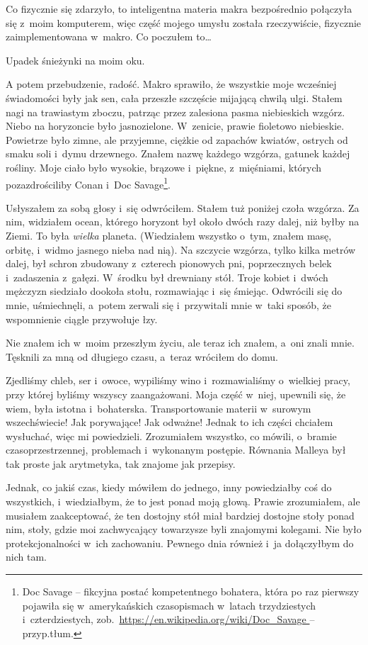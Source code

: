 \documentclass[oneside,polish,11pt,sfheadings]{mwbk}
\begin{document}
Co fizycznie się zdarzyło, to inteligentna materia makra bezpośrednio
połączyła się z~moim komputerem, więc część mojego umysłu została
rzeczywiście, fizycznie zaimplementowana w~makro. Co poczułem to\ldots

Upadek śnieżynki na moim oku.

A potem przebudzenie, radość. Makro sprawiło, że wszystkie moje
wcześniej świadomości były jak sen, cała przeszłe szczęście mijającą
chwilą ulgi. Stałem nagi na trawiastym zboczu, patrząc przez zalesiona
pasma niebieskich wzgórz. Niebo na horyzoncie było jasnozielone. W~zenicie, prawie fioletowo niebieskie. Powietrze było zimne, ale
przyjemne, ciężkie od zapachów kwiatów, ostrych od smaku soli i~dymu
drzewnego. Znałem nazwę każdego wzgórza, gatunek każdej rośliny. Moje
ciało było wysokie, brązowe i~piękne, z~mięśniami, których
pozazdrościliby Conan i~Doc Savage\footnote{ Doc Savage -- fikcyjna postać
kompetentnego bohatera, która po raz pierwszy pojawiła się w~amerykańskich czasopismach w~latach trzydziestych i~czterdziestych,
zob.~\url{https://en.wikipedia.org/wiki/Doc_Savage } -- przyp.tłum.}. 

Usłyszałem za sobą głosy i~się odwróciłem. Stałem tuż poniżej czoła
wzgórza. Za nim, widziałem ocean, którego horyzont był około dwóch razy
dalej, niż byłby na Ziemi. To była \emph{wielka} planeta. (Wiedziałem
wszystko o~tym, znałem masę, orbitę, i~widmo jasnego nieba nad nią). Na
szczycie wzgórza, tylko kilka metrów dalej, był schron zbudowany z~czterech pionowych pni, poprzecznych belek i~zadaszenia z~gałęzi. W~środku był drewniany stół. Troje kobiet i~dwóch mężczyzn siedziało
dookoła stołu, rozmawiając i~się śmiejąc. Odwrócili się do mnie,
uśmiechnęli, a~potem zerwali się i~przywitali mnie w~taki sposób, że
wspomnienie ciągle przywołuje łzy.

Nie znałem ich w~moim przeszłym życiu, ale teraz ich znałem, a~oni znali
mnie. Tęsknili za mną od długiego czasu, a~teraz wróciłem do domu.

Zjedliśmy chleb, ser i~owoce, wypiliśmy wino i~rozmawialiśmy o~wielkiej
pracy, przy której byliśmy wszyscy zaangażowani. Moja część w~niej,
upewnili się, że wiem, była istotna i~bohaterska. Transportowanie
materii w~surowym wszechświecie! Jak porywające! Jak odważne! Jednak to
ich części chciałem wysłuchać, więc mi powiedzieli. Zrozumiałem
wszystko, co mówili, o~bramie czasoprzestrzennej, problemach i~wykonanym
postępie. Równania Malleya był tak proste jak arytmetyka, tak znajome
jak przepisy.

Jednak, co jakiś czas, kiedy mówiłem do jednego, inny powiedziałby coś
do wszystkich, i~wiedziałbym, że to jest ponad moją głową. Prawie
zrozumiałem, ale musiałem zaakceptować, że ten dostojny stół miał
bardziej dostojne stoły ponad nim, stoły, gdzie moi zachwycający
towarzysze byli znajomymi kolegami. Nie było protekcjonalności w~ich
zachowaniu. Pewnego dnia również i~ja dołączyłbym do nich tam.
\end{document}
